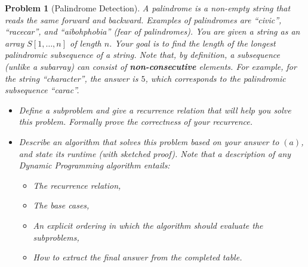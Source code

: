 \documentclass[10pt]{article}
\newtheorem{problem}{\sc\color{cit}Problem}
\begin{document}
\begin{problem}[Palindrome Detection]
A palindrome is a non-empty string that reads the same forward
and backward. Examples of palindromes are ``civic'',
``racecar'', and ``aibohphobia'' (fear of palindromes). You are given a string as an array $S[1, \ldots, n]$ of length $n$. Your goal is to find the length of the longest palindromic subsequence of a string. Note that, by definition, a subsequence (unlike a subarray) can consist of \textbf{non-consecutive} elements. For example, for the string ``character'', the answer is $5$, which corresponds to the palindromic subsequence ``carac''.

\begin{itemize}
    \item[(a)] Define a subproblem and give a recurrence relation that will help you solve this problem. Formally prove the correctness of your recurrence.
    \item[(b)] Describe an algorithm that solves this problem based on your answer to $(a)$, and state its runtime (with sketched proof). Note that a description of any Dynamic Programming algorithm entails:
    \begin{itemize}
        \item The recurrence relation,
        \item The base cases,
        \item An explicit ordering in which the algorithm should evaluate the subproblems,
        \item How to extract the final answer from the completed table.
    \end{itemize}
\end{itemize}

\end{problem}
\end{document}
